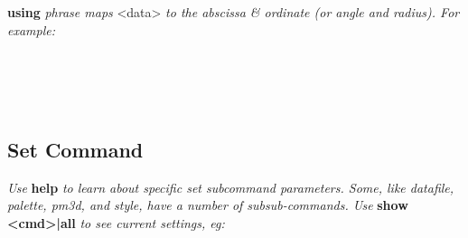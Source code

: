 \textbf{using}\textit{ phrase maps }<data>\textit{ to the abscissa \& ordinate (or angle and radius). For example:}\\
\\
\\
\\
\\



\subsection*{Set Command}
\textit{Use }\textbf{help}\textit{ to learn about specific set subcommand parameters. Some, like datafile, palette, pm3d, and style, have a number of subsub-commands. Use }\textbf{show <cmd>|all}\textit{ to see current settings, eg:}\\
\\
\\
